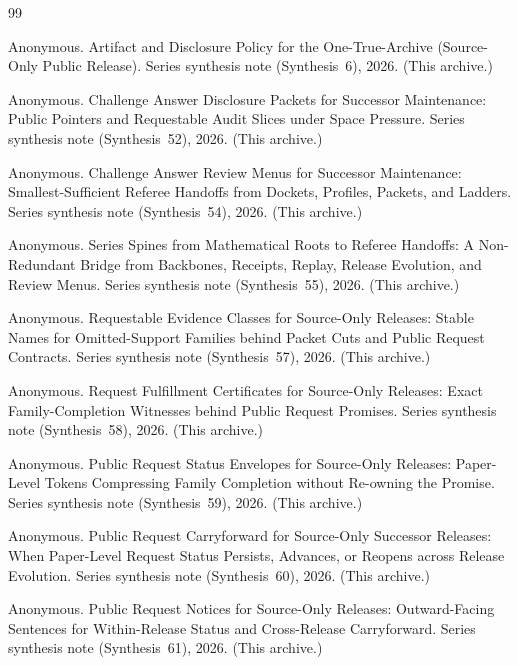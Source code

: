 \documentclass[11pt]{article}
\begin{document}
\begin{thebibliography}{99}\small

Anonymous.
\newblock Artifact and Disclosure Policy for the One-True-Archive (Source-Only Public Release).
\newblock Series synthesis note (Synthesis~6), 2026. (This archive.)

Anonymous.
\newblock Challenge Answer Disclosure Packets for Successor Maintenance: Public Pointers and Requestable Audit Slices under Space Pressure.
\newblock Series synthesis note (Synthesis~52), 2026. (This archive.)

Anonymous.
\newblock Challenge Answer Review Menus for Successor Maintenance: Smallest-Sufficient Referee Handoffs from Dockets, Profiles, Packets, and Ladders.
\newblock Series synthesis note (Synthesis~54), 2026. (This archive.)

Anonymous.
\newblock Series Spines from Mathematical Roots to Referee Handoffs: A Non-Redundant Bridge from Backbones, Receipts, Replay, Release Evolution, and Review Menus.
\newblock Series synthesis note (Synthesis~55), 2026. (This archive.)

Anonymous.
\newblock Requestable Evidence Classes for Source-Only Releases: Stable Names for Omitted-Support Families behind Packet Cuts and Public Request Contracts.
\newblock Series synthesis note (Synthesis~57), 2026. (This archive.)

Anonymous.
\newblock Request Fulfillment Certificates for Source-Only Releases: Exact Family-Completion Witnesses behind Public Request Promises.
\newblock Series synthesis note (Synthesis~58), 2026. (This archive.)

Anonymous.
\newblock Public Request Status Envelopes for Source-Only Releases: Paper-Level Tokens Compressing Family Completion without Re-owning the Promise.
\newblock Series synthesis note (Synthesis~59), 2026. (This archive.)

Anonymous.
\newblock Public Request Carryforward for Source-Only Successor Releases: When Paper-Level Request Status Persists, Advances, or Reopens across Release Evolution.
\newblock Series synthesis note (Synthesis~60), 2026. (This archive.)

Anonymous.
\newblock Public Request Notices for Source-Only Releases: Outward-Facing Sentences for Within-Release Status and Cross-Release Carryforward.
\newblock Series synthesis note (Synthesis~61), 2026. (This archive.)


\end{thebibliography}
\end{document}
